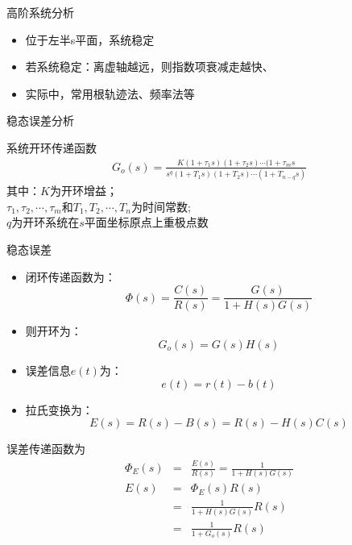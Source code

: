 \begin{frame}{高阶系统分析}
\begin{block}{}
\begin{itemize}
\item<+-> 位于左半s平面，系统稳定
\item<+-> 若系统稳定：离虚轴越远，则指数项衰减走越快、
\item<+-> 实际中，常用根轨迹法、频率法等
\end{itemize}
\end{block}
\end{frame}
\begin{frame}{稳态误差分析}
\begin{block}{系统开环传递函数}
\begin{eqnarray*}
G_o(s)=\frac{K(1+\tau_1s)(1+\tau_2s)\cdots(1+\tau_ms}{s^q(1+T_1s)(1+T_2s)\cdots(1+T_{n-q}s)}
\end{eqnarray*}
其中：$K$为开环增益；\\
$\tau_1,\tau_2,\cdots,\tau_m$和$T_1,T_2,\cdots,T_n$为时间常数;\\
$q$为开环系统在$s$平面坐标原点上重极点数
\end{block}
\end{frame}
\begin{frame}
\begin{block}{稳态误差}
\begin{itemize}
\item<+-> 闭环传递函数为：
\[\Phi(s)=\frac{C(s)}{R(s)}=\frac{G(s)}{1+H(s)G(s)}\]
\item<+-> 则开环为：
\[G_o(s)=G(s)H(s)\]
\end{itemize}
\end{block}
\end{frame}
\begin{frame}
\begin{block}{}
\begin{itemize}
\item<+-> 误差信息$e(t)$为：
\[e(t)=r(t)-b(t)\]
\item<+-> 拉氏变换为：
\[E(s)=R(s)-B(s)=R(s)-H(s)C(s)\]
\end{itemize}
\end{block}
\end{frame}
\begin{frame}
\begin{block}{误差传递函数为}
\begin{eqnarray*}
\Phi_E(s)&=&\frac{E(s)}{R(s)}=\frac{1}{1+H(s)G(s)}\\
E(s)&=&\Phi_E(s)R(s)\\
&=&\frac{1}{1+H(s)G(s)}R(s)\\
&=&\frac{1}{1+G_o(s)}R(s)
\end{eqnarray*}
\end{block}
\end{frame}
